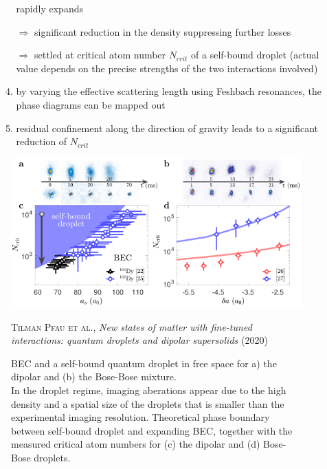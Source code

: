 \begin{itemize}
\begin{enumerate}
                rapidly expands
            \item[$\Rightarrow$] significant reduction in the density suppressing further losses
            \item[$\Rightarrow$] settled at critical atom number $N_{crit}$ of a self-bound droplet (actual value  depends on the precise strengths of the two interactions involved)
            \item by varying the effective scattering length using Feshbach resonances, the phase diagrams can
                be mapped out
            \item residual confinement along the direction of gravity leads to a significant reduction of $N_{crit}$
        \end{enumerate}
\end{itemize}

\begin{figure}[H]
    \centering
    \includegraphics[width=1.0\textwidth]{IMAGE/self_bound.png}\\
    \caption{
            BEC and a self-bound quantum droplet in free space for a) the dipolar and (b) the Bose-Bose mixture. \\
            In the droplet regime, imaging aberations appear due to the high density and a spatial size of the droplets that is smaller than the experimental imaging resolution. Theoretical phase boundary between self-bound droplet and expanding BEC, together with the measured critical atom numbers for (c) the dipolar and (d) Bose-Bose droplets.
      }
    \textsc{Tilman Pfau et al.}, \emph{New states of matter with fine-tuned interactions: quantum droplets and dipolar supersolids} (2020)
    \label{fig:self_bound}
\end{figure}

